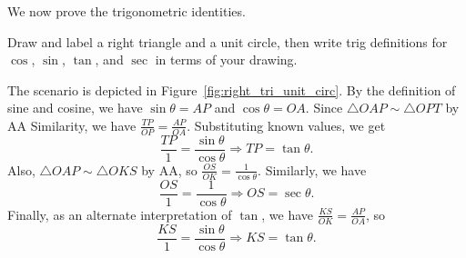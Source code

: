 \documentclass[../gatm_answers.tex]{subfiles}
\begin{document}
\begin{outer_problem}
\item We now prove the trigonometric identities.
\end{outer_problem}

\begin{inner_problem}
\item Draw and label a right triangle and a unit circle, then write trig definitions for $\cos$, $\sin$, $\tan$, and $\sec$ in terms of your drawing.
\end{inner_problem}

The scenario is depicted in Figure~\ref{fig:right_tri_unit_circ}. By the definition of sine and cosine, we have $\sin\theta=AP$ and $\cos\theta=OA$. Since $\triangle OAP \sim \triangle OPT$ by AA Similarity, we have $\frac{TP}{OP}=\frac{AP}{OA}$. Substituting known values, we get $$\frac{TP}{1}=\frac{\sin\theta}{\cos\theta}\Longrightarrow TP=\tan\theta.$$ Also, $\triangle OAP \sim \triangle OKS$ by AA, so $\frac{OS}{OK}=\frac{1}{\cos\theta}$. Similarly, we have $$\frac{OS}{1}=\frac{1}{\cos\theta}\Longrightarrow OS=\sec\theta.$$ Finally, as an alternate interpretation of $\tan$, we have $\frac{KS}{OK}=\frac{AP}{OA}$, so $$\frac{KS}{1}=\frac{\sin\theta}{\cos\theta}\Longrightarrow KS = \tan\theta.$$
\end{document}
